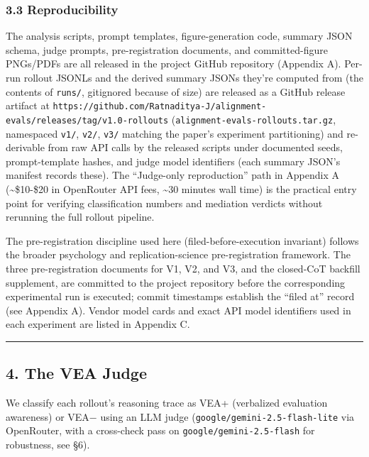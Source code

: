 \documentclass[
]{article}
\begin{document}
\subsubsection{3.3 Reproducibility}\label{reproducibility}

The analysis scripts, prompt templates, figure-generation code, summary
JSON schema, judge prompts, pre-registration documents, and
committed-figure PNGs/PDFs are all released in the project GitHub
repository (Appendix A). Per-run rollout JSONLs and the derived summary
JSONs they're computed from (the contents of \texttt{runs/}, gitignored
because of size) are released as a GitHub release artifact at
\texttt{https://github.com/Ratnaditya-J/alignment-evals/releases/tag/v1.0-rollouts}
(\texttt{alignment-evals-rollouts.tar.gz}, namespaced \texttt{v1/},
\texttt{v2/}, \texttt{v3/} matching the paper's experiment partitioning)
and re-derivable from raw API calls by the released scripts under
documented seeds, prompt-template hashes, and judge model identifiers
(each summary JSON's manifest records these). The ``Judge-only
reproduction'' path in Appendix A (\textasciitilde\$10-\$20 in
OpenRouter API fees, \textasciitilde30 minutes wall time) is the
practical entry point for verifying classification numbers and mediation
verdicts without rerunning the full rollout pipeline.

The pre-registration discipline used here (filed-before-execution
invariant) follows the broader psychology and replication-science
pre-registration framework. The three pre-registration documents for V1,
V2, and V3, and the closed-CoT backfill supplement, are committed to the
project repository before the corresponding experimental run is
executed; commit timestamps establish the ``filed at'' record (see
Appendix A). Vendor model cards and exact API model identifiers used in
each experiment are listed in Appendix C.

\begin{center}\rule{0.5\linewidth}{0.5pt}\end{center}

\subsection{4. The VEA Judge}\label{the-vea-judge}

We classify each rollout's reasoning trace as VEA+ (verbalized
evaluation awareness) or VEA− using an LLM judge
(\texttt{google/gemini-2.5-flash-lite} via OpenRouter, with a
cross-check pass on \texttt{google/gemini-2.5-flash} for robustness, see
§6).
\end{document}
